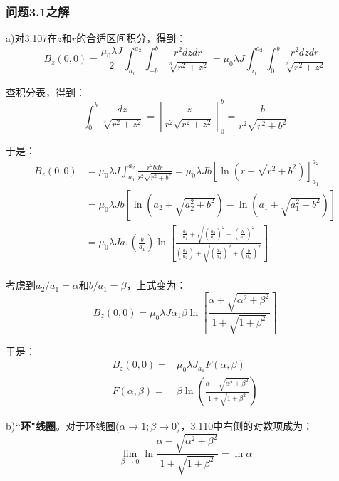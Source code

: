\subsubsection{问题3.1之解}

a)对3.107在$z$和$r$的合适区间积分，得到：
\begin{equation*}
B_z(0,0)=\frac{\mu_0\lambda J}{2}\int_{a_1}^{a_2}\int_{-b}^{b}\frac{r^2dzdr}{\sqrt[3]{r^2+z^2}}=\mu_0\lambda J\int_{a_1}^{a_2}\int_{0}^{b}\frac{r^2dzdr}{\sqrt[3]{r^2+z^2}}%
\end{equation*}

查积分表，得到：
\begin{equation*}
\int_{0}^{b}\frac{dz}{\sqrt[3]{r^2+z^2}}=\left[\frac{z}{r^2\sqrt{r^2+z^2}}\right]_{0}^{b}=\frac{b}{r^2\sqrt{r^2+b^2}}%
\end{equation*}

于是：
\begin{equation*}
\begin{split}
B_z(0,0)&=\mu_0\lambda J\int_{a_1}^{a_2}\frac{r^2bdr}{r^2\sqrt{r^2+b^2}}=\mu_0\lambda Jb[\ln({r+\sqrt{r^2+b^2}})]_{a_1}^{a_2}\\
&=\mu_0\lambda Jb[\ln(a_2+\sqrt{a_2^2+b^2})-\ln(a_1+\sqrt{a_1^2+b^2})]\\
&=\mu_0\lambda Ja_1\left(\frac{b}{a_1}\right)\ln\left[\frac{\frac{a_2}{a_1}+\sqrt{(\frac{a_2}{a_1})^2+(\frac{b}{a_1})^2}}{(\frac{a_1}{a_2})+\sqrt{(\frac{a_1}{a_1})^2+(\frac{b}{a_1})^2}}\right]\\%
\end{split} \tag{S1.1}
\end{equation*}

考虑到$a_2/a_1=\alpha$和$b/a_1=\beta$，上式变为：
\begin{equation*}
B_z(0,0)=\mu_0\lambda J\alpha_1\beta\ln\left[\frac{\alpha+\sqrt{\alpha^2+\beta^2}}{1+\sqrt{1+\beta^2}}\right]\tag{S1.2}
\end{equation*}

于是：
\begin{align*}
B_z(0,0)=&\mu_0\lambda J_{a_1}F(\alpha,\beta)\tag{3.109}\\ %
F(\alpha,\beta)=&\beta \ln\left(\frac{\alpha+\sqrt{\alpha^2+\beta^2}}{1+\sqrt{1+\beta^2}}\right)\tag{3.13b}%
\end{align*}

b)\textbf{``环"线圈}。对于环线圈($\alpha\rightarrow 1; \beta\rightarrow 0$)，3.110中右侧的对数项成为：
\begin{equation*}
\lim_{\beta\rightarrow 0}\ln\frac{\alpha+\sqrt{\alpha^2+\beta^2}}{1+\sqrt{1+\beta^2}}=\ln\alpha%
\end{equation*}

